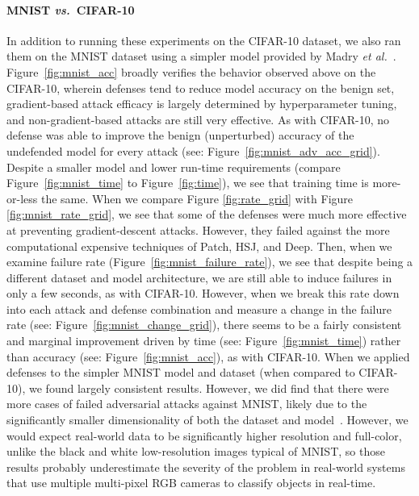\documentclass[lettersize,journal]{IEEEtran}
\begin{document}
\paragraph{MNIST \textit{vs.}~CIFAR-10}
In addition to running these experiments on the CIFAR-10 dataset, we also ran them on the MNIST dataset using a simpler model provided by Madry \textit{et al.}~\cite{madry2017towards}. Figure~\ref{fig:mnist_acc} broadly verifies the behavior observed above on the CIFAR-10, wherein defenses tend to reduce model accuracy on the benign set, gradient-based attack efficacy is largely determined by hyperparameter tuning, and non-gradient-based attacks are still very effective. As with CIFAR-10, no defense was able to improve the benign (unperturbed) accuracy of the undefended model for every attack (see: Figure~\ref{fig:mnist_adv_acc_grid}). Despite a smaller model and lower run-time requirements (compare Figure~\ref{fig:mnist_time} to Figure~\ref{fig:time}), we see that training time is more-or-less the same. When we compare Figure \ref{fig:rate_grid} with Figure \ref{fig:mnist_rate_grid}, we see that some of the defenses were much more effective at preventing gradient-descent attacks. However, they failed against the more computational expensive techniques of Patch, HSJ, and Deep. Then, when we examine failure rate (Figure~\ref{fig:mnist_failure_rate}), we see that despite being a different dataset and model architecture, we are still able to induce failures in only a few seconds, as with CIFAR-10. However, when we break this rate down into each attack and defense combination and measure a change in the failure rate (see: Figure~\ref{fig:mnist_change_grid}), there seems to be a fairly consistent and marginal improvement driven by time (see: Figure~\ref{fig:mnist_time}) rather than accuracy (see:  Figure~\ref{fig:mnist_acc}), as with CIFAR-10. When we applied defenses to the simpler MNIST model and dataset (when compared to CIFAR-10), we found largely consistent results. However, we did find that there were more cases of failed adversarial attacks against MNIST, likely due to the significantly smaller dimensionality of both the dataset and model~\cite{dohmatob_generalized_2019}. However, we would expect real-world data to be significantly higher resolution and full-color, unlike the black and white low-resolution images typical of MNIST, so those results probably underestimate the severity of the problem in real-world systems that use multiple multi-pixel RGB cameras to classify objects in real-time.
\end{document}
